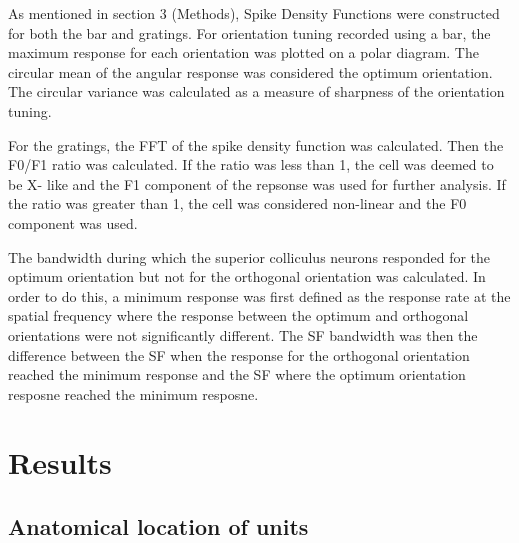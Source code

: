 		As mentioned in section 3 (Methods), Spike Density Functions were constructed for both the bar and gratings. For orientation tuning recorded using a bar, the maximum response for each orientation was plotted on a polar diagram. The circular mean of the angular response was considered the optimum orientation. The circular variance was calculated as a measure of sharpness of the orientation tuning.
		
		For the gratings, the FFT of the spike density function was calculated. Then the F0/F1 ratio was calculated. If the ratio was less than 1, the cell was deemed to be X- like and the F1 component of the repsonse was used for further analysis. If the ratio was greater than 1, the cell was considered non-linear and the F0 component was used.
		
		The bandwidth during which the superior colliculus neurons responded for the optimum orientation but not for the orthogonal orientation was calculated. In order to do this,  a minimum response was first defined as the response rate at the spatial frequency where the response between the optimum and orthogonal orientations were not significantly different. The SF bandwidth was then the difference between the SF when the response for the orthogonal orientation reached the minimum response and the SF where the optimum orientation resposne reached the minimum resposne.
		
\section{Results}
	\subsection{Anatomical location of units}

